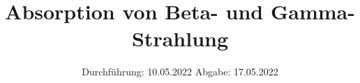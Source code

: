 

\subject{V704}
\title{Absorption von Beta- und Gamma-Strahlung}
\date{
  Durchführung: 10.05.2022
  \hspace{3em}
  Abgabe: 17.05.2022
}



\maketitle
\thispagestyle{empty}
\tableofcontents
\newpage








\newpage
\printbibliography{}
\nocite{matplotlib}
\nocite{numpy}
\nocite{scipy}
\nocite{uncertainties}
\nocite{reback2020pandas}

\newpage




